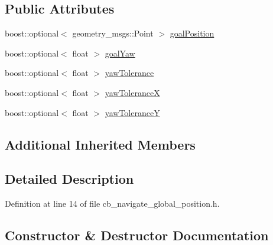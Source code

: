 \subsection*{Public Attributes}
\begin{DoxyCompactItemize}
\item 
boost\+::optional$<$ geometry\+\_\+msgs\+::\+Point $>$ \hyperlink{classcl__move__base__z_1_1CbNavigateGlobalPosition_a51a0266fd9a63e99f26e88933529c559}{goal\+Position}
\item 
boost\+::optional$<$ float $>$ \hyperlink{classcl__move__base__z_1_1CbNavigateGlobalPosition_a839900de7f664b27c9be189fadbaa003}{goal\+Yaw}
\item 
boost\+::optional$<$ float $>$ \hyperlink{classcl__move__base__z_1_1CbNavigateGlobalPosition_af7c005e386a5062091618384534cd2b9}{yaw\+Tolerance}
\item 
boost\+::optional$<$ float $>$ \hyperlink{classcl__move__base__z_1_1CbNavigateGlobalPosition_a3e649f9ae9f1118c4f08332e4d5908dc}{yaw\+ToleranceX}
\item 
boost\+::optional$<$ float $>$ \hyperlink{classcl__move__base__z_1_1CbNavigateGlobalPosition_a2405f30f99b72c7daae79175f3e78677}{yaw\+ToleranceY}
\end{DoxyCompactItemize}
\subsection*{Additional Inherited Members}


\subsection{Detailed Description}


Definition at line 14 of file cb\+\_\+navigate\+\_\+global\+\_\+position.\+h.



\subsection{Constructor \& Destructor Documentation}
\mbox{\label{classcl__move__base__z_1_1CbNavigateGlobalPosition_aec75d2481b2057bbbdad9513c4dc08cd}} 
